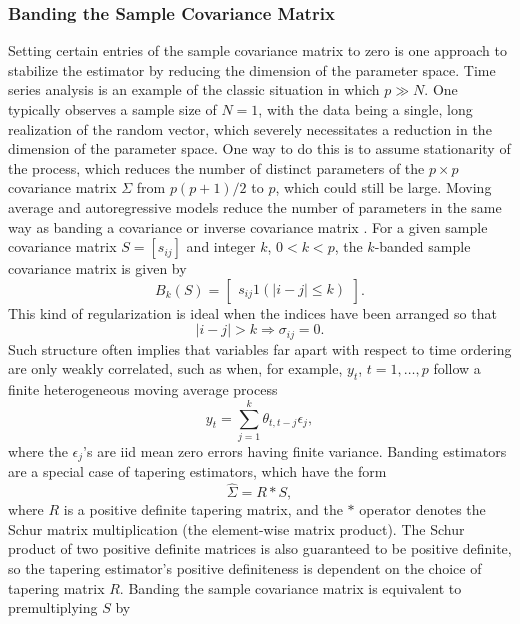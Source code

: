 \subsubsection{Banding the Sample Covariance Matrix}
 
Setting certain entries of the sample covariance matrix to zero is one approach to stabilize the estimator by reducing the dimension of the parameter space. Time series analysis is an example of the classic situation in which $p \gg N$. One typically observes a sample size of $N = 1$, with the data being a single, long realization of the random vector, which severely necessitates a reduction in the dimension of the parameter space. One way to do this is to assume stationarity of the process, which reduces the number of distinct parameters of the $p \times p$ covariance matrix $\Sigma$ from $p\left(p + 1\right)/2$ to $p$, which could still be large. Moving average and autoregressive models reduce the number of parameters in the same way as banding a covariance or inverse covariance matrix \citep{bickel2008regularized,wu2009banding}.  For a given sample covariance matrix $S = \left[ s_{ij} \right]$ and integer $k$, $0 < k < p$, the $k$-banded sample covariance matrix is given by
\begin{equation} \label{eq:general-banded-estimator} 
B_k\left(S\right) = \begin{bmatrix} s_{ij} 1\left(\vert i-j \vert \le k\right) \end{bmatrix}.
\end{equation}
\noindent
This kind of regularization is ideal when the indices have been arranged so that
\[
\vert i -  j\vert > k \Rightarrow  \sigma_{ij} = 0.
\]
Such structure often implies that variables far apart with respect to time ordering are only weakly correlated, such as when, for example, $y_t$, $t = 1, \dots,p$ follow a finite heterogeneous moving average process
\begin{equation*} 
y_t = \sum_{j = 1}^k \theta_{t, t-j} \epsilon_j,
\end{equation*}
\noindent
where the $\epsilon_j$'s are iid mean zero errors having finite variance. Banding estimators are a special case of tapering estimators, which have the form
\begin{equation} \label{eq:general-tapering-estimator} 
\hat{\Sigma} = R \ast S, 
\end{equation}
\noindent
where $R$ is a positive definite tapering matrix, and the $ \ast $ operator denotes the Schur matrix multiplication (the element-wise matrix product). The Schur product of two positive definite matrices is also guaranteed to be positive definite, so the tapering estimator's positive definiteness is dependent on the choice of tapering matrix $R$. Banding the sample covariance matrix is equivalent to premultiplying $S$ by 
